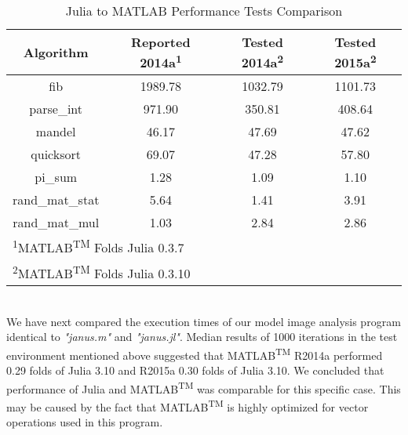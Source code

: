 \begin{table} 
    \begin{tabular}{cccc}
    \hline
        \textbf{Algorithm} & \textbf{Reported 2014a\textsuperscript{1}} & \textbf{Tested  2014a\textsuperscript{2}} & \textbf{Tested 2015a\textsuperscript{2}}\\
        \hline
        fib & 1989.78 & 1032.79 & 1101.73 \\ 
        \hline
        parse\_int & 971.90 & 350.81 & 408.64 \\ 
        \hline
        mandel & 46.17 & 47.69 & 47.62 \\ 
        \hline
        quicksort & 69.07 & 47.28 & 57.80 \\ 
        \hline
        pi\_sum & 1.28 & 1.09 & 1.10 \\ 
        \hline
        rand\_mat\_stat & 5.64 & 1.41 & 3.91 \\ 
        \hline
        rand\_mat\_mul & 1.03 & 2.84 & 2.86 \\
        \hline
        \multicolumn{4}{l}{\textsuperscript{1}MATLAB\textsuperscript{TM} Folds Julia 0.3.7} \\
        \multicolumn{4}{l}{\textsuperscript{2}MATLAB\textsuperscript{TM} Folds Julia 0.3.10} \\
    \end{tabular}
    \caption{Julia to MATLAB Performance Tests Comparison}
\end{table}\\
  
We have next compared the execution times of our model image analysis program identical to \textit{"janus.m"} and \textit{"janus.jl"}. Median results of 1000 iterations in the test environment mentioned above suggested that MATLAB\textsuperscript{TM} R2014a performed 0.29 folds of Julia 3.10 and R2015a 0.30 folds of Julia 3.10. We concluded that performance of Julia and MATLAB\textsuperscript{TM} was comparable for this specific case. This may be caused by the fact that MATLAB\textsuperscript{TM} is highly optimized for vector operations used in this program.
  
  
  
  